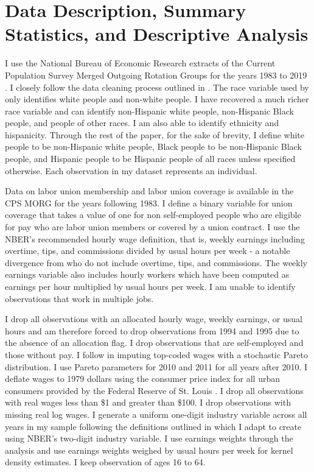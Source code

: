 \documentclass[11pt]{article}
\begin{document}
\section{Data Description, Summary Statistics, and Descriptive Analysis}\label{sec:data}
I use the National Bureau of Economic Research extracts of the Current Population Survey Merged Outgoing Rotation Groups for the years 1983 to 2019 \citep{nbercps}. I closely follow the data cleaning process outlined in \citet{fll2021}. The race variable used by \citet{fll2021} only identifies white people and non-white people. I have recovered a much richer race variable and can identify non-Hispanic white people, non-Hispanic Black people, and people of other races. I am also able to identify ethnicity and hispanicity. Through the rest of the paper, for the sake of brevity, I define white people to be non-Hispanic white people, Black people to be non-Hispanic Black people, and Hispanic people to be Hispanic people of all races unless specified otherwise. Each observation in my dataset represents an individual.

Data on labor union membership and labor union coverage is available in the CPS MORG for the years following 1983. I define a binary variable for union coverage that takes a value of one for non self-employed people who are eligible for pay who are labor union members or covered by a union contract. I use the NBER's recommended hourly wage definition, that is, weekly earnings including overtime, tips, and commissions divided by usual hours per week - a notable divergence from \citet{fll2021} who do not include overtime, tips, and commissions. The weekly earnings variable also includes hourly workers which have been computed as earnings per hour multiplied by usual hours per week. I am unable to identify observations that work in multiple jobs. 

I drop all observations with an allocated hourly wage, weekly earnings, or usual hours and am therefore forced to drop observations from 1994 and 1995 due to the absence of an allocation flag. I drop observations that are self-employed and those without pay. I follow \citet{fll2021} in imputing top-coded wages with a stochastic Pareto distribution. I use Pareto parameters for 2010 and 2011 for all years after 2010. I deflate wages to 1979 dollars using the consumer price index for all urban consumers provided by the Federal Reserve of St. Louis \citep{cpiaucsl}. I drop all observations with real wages less than \$1 and greater than \$100. I drop observations with missing real log wages. I generate a uniform one-digit industry variable across all years in my sample following the definitions outlined in \citet{fll2021} which I adapt to create using NBER's two-digit industry variable. I use earnings weights through the analysis and use earnings weights weighed by usual hours per week for kernel density estimates. I keep observation of ages 16 to 64.
\end{document}
